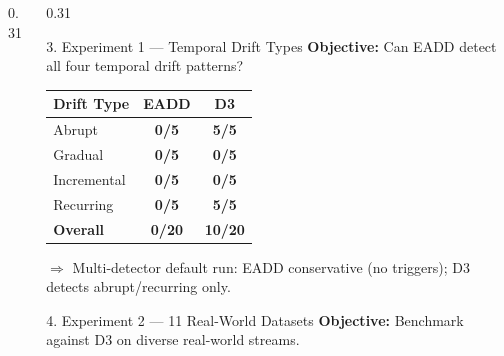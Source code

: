 \documentclass[final]{beamer}
\begin{document}
\begin{frame}[t]
\begin{columns}[t]
\begin{column}{0.31\textwidth}
\end{column}

\begin{column}{0.31\textwidth}

\begin{block}{3. Experiment 1 — Temporal Drift Types}
\large
\textbf{Objective:} Can EADD detect all four temporal drift patterns?

\vskip0.5cm
\begin{table}
\centering
\renewcommand{\arraystretch}{1.3}
\begin{tabular}{lcc}
\toprule
\textbf{Drift Type} & \textbf{EADD} & \textbf{D3} \\
\midrule
Abrupt        & \color{AccentRed}\textbf{0/5} & \color{AccentGreen}\textbf{5/5} \\
Gradual       & \color{AccentRed}\textbf{0/5} & \color{AccentRed}\textbf{0/5} \\
Incremental   & \color{AccentRed}\textbf{0/5} & \color{AccentRed}\textbf{0/5} \\
Recurring     & \color{AccentRed}\textbf{0/5} & \color{AccentGreen}\textbf{5/5} \\
\midrule
\textbf{Overall} & \color{AccentRed}\textbf{0/20} & \color{AccentRed}\textbf{10/20} \\
\bottomrule
\end{tabular}
\end{table}

\vskip0.3cm
{\color{MahidolBlue}$\Rightarrow$} Multi-detector default run: EADD conservative (no triggers); D3 detects abrupt/recurring only.
\end{block}

\vskip1cm

\begin{block}{4. Experiment 2 — 11 Real-World Datasets}
\large
\textbf{Objective:} Benchmark against D3 on diverse real-world streams.


\end{block}
\end{column}
\end{columns}
\end{frame}
\end{document}
